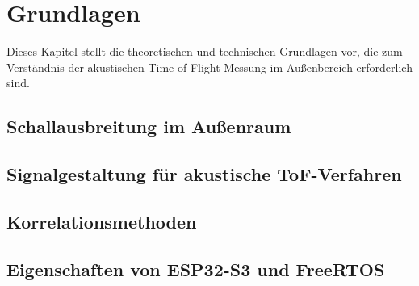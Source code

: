 \section{Grundlagen}

Dieses Kapitel stellt die theoretischen und technischen Grundlagen vor, die zum Verständnis der akustischen Time-of-Flight-Messung im Außenbereich erforderlich sind.

\subsection{Schallausbreitung im Außenraum}

\subsection{Signalgestaltung für akustische ToF-Verfahren}

\subsection{Korrelationsmethoden}


\subsection{Eigenschaften von ESP32-S3 und FreeRTOS}

